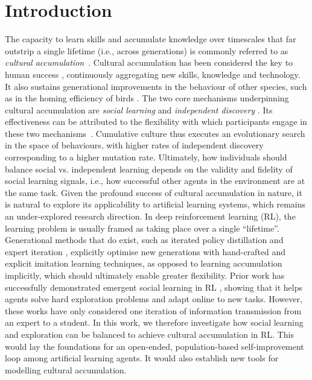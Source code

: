 \documentclass{article}
\begin{document}
\section{Introduction}
The capacity to learn skills and accumulate knowledge over timescales that far outstrip a single lifetime (i.e., across generations) is commonly referred to as \textit{cultural accumulation}~\citep{Hofstede94, Tennie09}. Cultural accumulation has been considered the key to human success \citep{Henrich19}, continuously aggregating new skills, knowledge and technology. It also sustains generational improvements in the behaviour of other species, such as in the homing efficiency of birds \citep{sasaki17}. The two core mechanisms underpinning cultural accumulation are \textit{social learning} \citep{bandura1977social, hoppitt2013social} and \textit{independent discovery} \citep{mesoudi2011variable}. Its effectiveness can be attributed to the flexibility with which participants engage in these two mechanisms~\citep{enquist08, rendell2010copy, mesoudi2018cumulative}. Cumulative culture thus executes an evolutionary search in the space of behaviours, with higher rates of independent discovery corresponding to a higher mutation rate. Ultimately, how individuals should balance social vs. independent learning depends on the validity and fidelity of social learning signals, i.e., how successful other agents in the environment are at the same task.
Given the profound success of cultural accumulation in nature, it is natural to explore its applicability to artificial learning systems, which remains an under-explored research direction. In deep reinforcement learning (RL), the learning problem is usually framed as taking place over a single ``lifetime''. Generational methods that do exist, such as iterated policy distillation \citep{schmitt2018kickstarting, Stooke21} and expert iteration \citep{anthony2017thinking}, explicitly optimise new generations with hand-crafted and explicit imitation learning techniques, as opposed to learning accumulation implicitly, which should ultimately enable greater flexibility. Prior work has successfully demonstrated emergent social learning in RL \citep{borsa2017observational, Ndousse21, bhoopchand23}, showing that it helps agents solve hard exploration problems and adapt online to new tasks. However, these works have only considered one iteration of information transmission from an expert to a student. In this work, we therefore investigate how social learning and exploration can be balanced to achieve cultural accumulation in RL. This would lay the foundations for an open-ended, population-based self-improvement loop among artificial learning agents. It would also establish new tools for modelling cultural accumulation.
\end{document}
